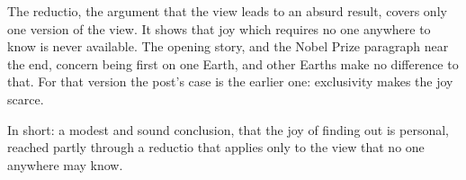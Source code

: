 \begin{afterword}
The reductio, the argument that the view leads to an absurd result, covers only one version of the view. It shows that joy which requires no one anywhere to know is never available. The opening story, and the Nobel Prize paragraph near the end, concern being first on one Earth, and other Earths make no difference to that. For that version the post's case is the earlier one: exclusivity makes the joy scarce.

In short: a modest and sound conclusion, that the joy of finding out is personal, reached partly through a reductio that applies only to the view that no one anywhere may know.
\end{afterword}
